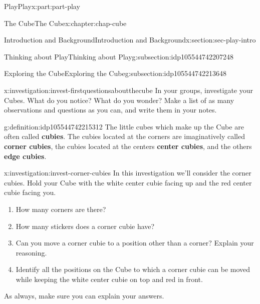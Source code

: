 \documentclass[oneside,10pt,]{book}
\newcommand{\terminology}[1]{\textbf{#1}}
\numberwithin{equation}{section}
\begin{document}
\begin{partptx}{Play}{}{Play}{}{}{x:part:part-play}
\begin{chapterptx}{The Cube}{}{The Cube}{}{}{x:chapter:chap-cube}
\begin{sectionptx}{Introduction and Background}{}{Introduction and Background}{}{}{x:section:sec-play-intro}
\begin{subsectionptx}{Thinking about Play}{}{Thinking about Play}{}{}{g:subsection:idp105544742207248}
\end{subsectionptx}
%
%
\typeout{************************************************}
\typeout{************************************************}
%
\begin{subsectionptx}{Exploring the Cube}{}{Exploring the Cube}{}{}{g:subsection:idp105544742213648}
\begin{investigation}{}{x:investigation:invest-firstquestionsaboutthecube}%
In your groups, investigate your Cubes. What do you notice? What do you wonder? Make a list of as many observations and questions as you can, and write them in your notes.%
\end{investigation}%
\begin{definition}{}{g:definition:idp105544742215312}%
%
%
%
%
The little cubes which make up the Cube are often called \terminology{cubies}. The cubies located at the corners are imaginatively called \terminology{corner cubies}, the cubies located at the centers \terminology{center cubies}, and the others \terminology{edge cubies}.%
\end{definition}
\begin{investigation}{}{x:investigation:invest-corner-cubies}%
In this investigation we'll consider the corner cubies. Hold your Cube with the white center cubie facing up and the red center cubie facing you.%
\begin{enumerate}
\item{}How many corners are there?%
\item{}How many stickers does a corner cubie have?%
\item{}Can you move a corner cubie to a position other than a corner? Explain your reasoning.%
\item{}Identify all the positions on the Cube to which a corner cubie can be moved while keeping the white center cubie on top and red in front.%
\end{enumerate}
As always, make sure you can explain your answers.%
\begin{image}{0.25}{0.5}{0.25}%

\end{image}
\end{investigation}
\end{subsectionptx}
\end{sectionptx}
\end{chapterptx}
\end{partptx}
\end{document}
